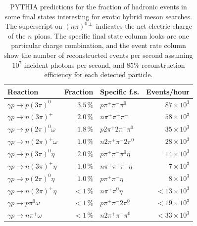 \begin{table}[h!]\centering
\caption[]{\label{tab:decay_rate_fractions}PYTHIA predictions for the fraction of hadronic events
in some final states interesting for exotic hybrid meson searches. The superscript on $(n\pi)^{0\pm}$
indicates the net electric charge of the $n$ pions. The specific final state column looks are one
particular charge combination, and the event rate column show the number of reconstructed events
per second assuming $10^{7}$ incident photons per second, and $85\%$ reconstruction efficiency
for each detected particle.}
\begin{tabular}{|l|r|l|r|}  \hline
Reaction & Fraction & Specific f.s. & Events/hour \\ \hline
$\gamma p \rightarrow p (3\pi)^{0}$ & $3.5\, \%$ & $p\pi^{+}\pi^{-}\pi^{0}$  & $87\times 10^{3}$ \\
$\gamma p \rightarrow n (3\pi)^{+}$ & $2.0\, \%$ & $n\pi^{+}\pi^{+}\pi^{-}$ & $58\times 10^{3}$ \\
$\gamma p \rightarrow p (2\pi)^{0}\omega$ & $1.8\, \%$ & $p2\pi^{+}2\pi^{-}\pi^{0}$ & $35\times 10^{3}$ \\
$\gamma p \rightarrow n (2\pi)^{+}\omega$ &  $1.0\, \%$ & $n2\pi^{+}\pi^{-}2\pi^{0}$ & $28\times 10^{3}$ \\
$\gamma p \rightarrow p (3\pi)^{0}\eta$ & $2.0\, \%$ & $p\pi^{+}\pi^{-}\pi^{0}\eta$ &  $14\times 10^{3}$ \\
$\gamma p \rightarrow n (3\pi)^{+}\eta$ &  $1.0\, \%$ & $n\pi^{+}\pi^{+}\pi^{-}\eta$ &  $7\times 10^{3}$ \\
$\gamma p \rightarrow p (2\pi)^{0}\eta$ & $1.0\, \%$ & $p\pi^{+}\pi^{-}\eta$ &  $8\times 10^{3}$ \\
$\gamma p \rightarrow n (2\pi)^{+}\eta$ &  $<1\, \%$ & $n\pi^{+}\pi^{0}\eta$ &  $<13\times 10^{3}$ \\
$\gamma p \rightarrow p \pi^{0}\omega$ & $<1\, \%$ & $p\pi^{+}\pi^{-}2\pi^{0}$ &  $<19\times 10^{3}$ \\
$\gamma p \rightarrow n \pi^{+}\omega$ &  $<1\, \%$ & $n2\pi^{+}\pi^{-}\pi^{0}$ &  $<33\times 10^{3}$ \\
\hline
\end{tabular} 
\end{table}


